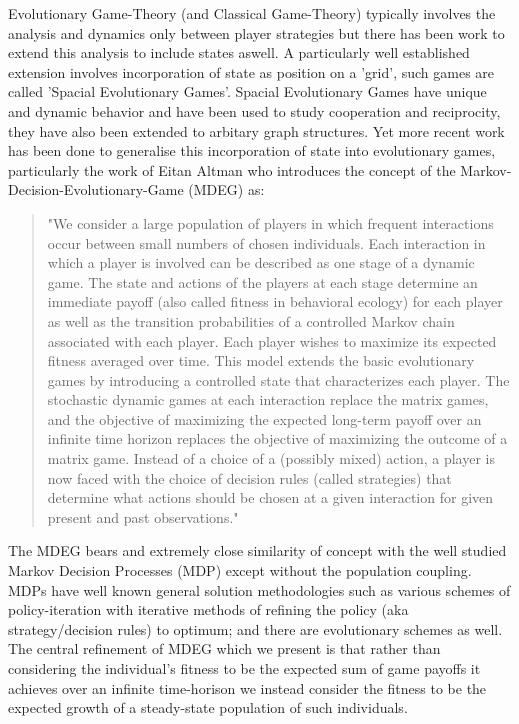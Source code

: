 \documentclass[journal,article,accept,oneauthors,pdftex,10pt,a4paper]{mdpi}
\begin{document}
Evolutionary Game-Theory (and Classical Game-Theory) typically involves the analysis and dynamics only between player strategies but there has been work to extend this analysis to include states aswell. A particularly well established extension involves incorporation of state as position on a 'grid', such games are called 'Spacial Evolutionary Games'\cite{spacial1}. Spacial Evolutionary Games have unique and dynamic behavior\cite{spacial2} and have been used to study cooperation and reciprocity\cite{spacial3}, they have also been extended to arbitary graph structures\cite{spacial4}.
Yet more recent work has been done to generalise this incorporation of state into evolutionary games, particularly the work of Eitan Altman\cite{markov2}\cite{markov3}\cite{markov4}\cite{markov5} who introduces the concept of the Markov-Decision-Evolutionary-Game (MDEG) as:
\begin{quote}
"We consider a large population of players in which frequent interactions occur between small numbers of chosen individuals. Each interaction in which a player is involved can be described as one stage of a dynamic game. The state and actions of the players at each stage determine an immediate payoff (also called fitness in behavioral ecology) for each player as well as the transition probabilities of a controlled Markov chain associated with each player. Each player wishes to maximize its expected fitness averaged over time.
This model extends the basic evolutionary games by introducing a controlled state that characterizes each player.
The stochastic dynamic games at each interaction replace the matrix games, and the objective of maximizing the expected long-term payoff over an infinite time horizon replaces the objective of maximizing the outcome of a matrix game. Instead of a choice of a (possibly mixed) action, a player is now faced with the choice of decision rules (called strategies) that determine what actions should be chosen at a given interaction for given present and past observations."\cite{markov3}
\end{quote}
The MDEG bears and extremely close similarity of concept with the well studied Markov Decision Processes (MDP) except without the population coupling. MDPs have well known general solution methodologies such as various schemes of policy-iteration with iterative methods of refining the policy (aka strategy/decision rules) to optimum; and there are evolutionary schemes as well.\cite{markov6}
The central refinement of MDEG which we present is that rather than considering the individual's fitness to be the expected sum of game payoffs it achieves over an infinite time-horison we instead consider the fitness to be the expected growth of a steady-state population of such individuals.
\end{document}
